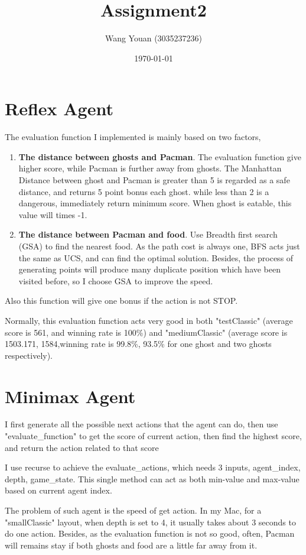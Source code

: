 \documentclass{article}
\title{Assignment2}
\author{Wang Youan (3035237236)}
\date{\today}
\begin{document}
	\maketitle
	\section{Reflex Agent}
	\label{sec:Q1}
	The evaluation function I implemented is mainly based on two factors,
	\begin{enumerate}
		\item \textbf{The distance between ghosts and Pacman}. The evaluation function give higher score, while Pacman is further away from ghosts. The Manhattan Distance between ghost and Pacman is greater than 5 is regarded as a safe distance, and returns 5 point bonus each ghost. while less than 2 is a dangerous, immediately return minimum score. When ghost is eatable, this value will times -1. 
		\item \textbf{The distance between Pacman and food}. Use Breadth first search (GSA) to find the nearest food. As the path cost is always one, BFS acts just the same as UCS, and can find the optimal solution. Besides, the process of generating points will produce many duplicate position which have been visited before, so I choose GSA to improve the speed. 
	\end{enumerate}
	Also this function will give one bonus if the action is not STOP.\par
	Normally, this evaluation function acts very good in both "testClassic" (average score is 561, and winning rate is 100\%) and "mediumClassic" (average score is 1503.171, 1584,winning rate is 99.8\%, 93.5\% for one ghost and two ghosts respectively).
	\section{Minimax Agent}
	\label{sec:Q2}
	I first generate all the possible next actions that the agent can do, then use "evaluate\_function" to get the score of current action, then find the highest score, and return the action related to that score\par
	I use recurse to achieve the evaluate\_actions, which needs 3 inputs, agent\_index, depth, game\_state. This single method can act as both min-value and max-value based on current agent index.\par
	The problem of such agent is the speed of get action. In my Mac, for a "smallClassic" layout, when depth is set to 4, it usually takes about 3 seconds to do one action. Besides, as the evaluation function is not so good, often, Pacman will remains stay if both ghosts and food are a little far away from it.
\end{document}
